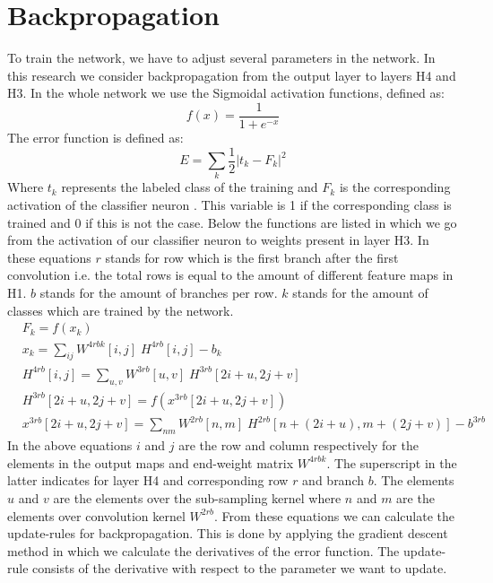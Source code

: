 \documentclass[a4paper,onecolumn]{report}
\begin{document}
\section{Backpropagation}
\label{sec:BP}
To train the network, we have to adjust several parameters in the network. In this research we consider backpropagation from the output layer to layers H4 and H3. In the whole network we use the Sigmoidal activation functions, defined as:
\begin{equation}
f(x)=\frac{1}{1+e^{-x}} 
\end{equation}	
The error function is defined as:
\begin{equation}
E=\sum_{k} \frac{1}{2}|t_k-F_{k}|^{2}
\end{equation}
Where $t_k$ represents the labeled class of the training and $F_{k}$ is the corresponding activation of the classifier neuron . This variable is 1 if the corresponding class is trained and 0 if this is not the case. Below the functions are listed in which we go from the activation of our classifier neuron to weights present in layer H3. In these equations $r$ stands for row which is the first branch after the first convolution i.e. the total rows is equal to the amount of different feature maps in H1. $b$ stands for the amount of branches per row. $k$ stands for the amount of classes which are trained by the network.
\begin{equation}
\begin{split}
	&F_{k}= f( x_{k}) \\
	& x_{k}=\sum_{ij} W^{4rbk}[i,j] \; H^{4rb}[i,j] - b_{k} \\
	&H^{4rb}[i,j]= \sum_{u,v} W^{3rb}[u,v] \; H^{3rb} [2i+u,2j+v] \\
	&H^{3rb} [2i+u,2j+v]= f\left (x^{3rb}[2i+u,2j+v] \right) \\
	&x^{3rb}[2i+u,2j+v]=\sum_{nm} W^{2rb}[n,m] \; H^{2rb}[n+(2i+u),m+(2j+v)] -b^{3rb}
\end{split}
\end{equation}
In the above equations $i$ and $j$ are the row and column respectively for the elements in the output maps and end-weight matrix $ W^{4rbk}$. The superscript in the latter indicates for layer H4 and corresponding row $r$ and branch $b$. The elements $u$ and $v$ are the elements over the sub-sampling kernel where $n$ and $m$ are the elements over convolution kernel $W^{2rb}$. From these equations we can calculate the update-rules for backpropagation. This is done by applying the gradient descent method in which we calculate the derivatives of the error function. The update-rule consists of the derivative with respect to the parameter we want to update.  
\end{document}
